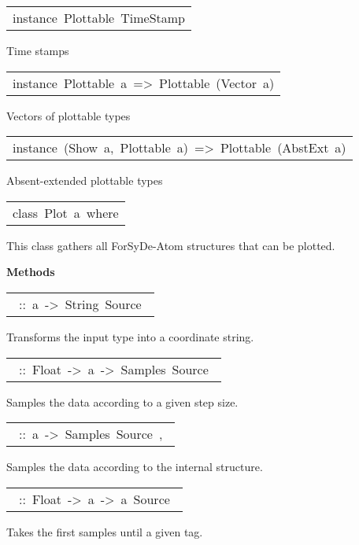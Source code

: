 \begin{haddockdesc}
\item[\begin{tabular}{@{}l}
instance\ Plottable\ TimeStamp
\end{tabular}]\haddockbegindoc
Time stamps\par


\item[\begin{tabular}{@{}l}
instance\ Plottable\ a\ =>\ Plottable\ (Vector\ a)
\end{tabular}]\haddockbegindoc
Vectors of plottable types\par


\item[\begin{tabular}{@{}l}
instance\ (Show\ a,\ Plottable\ a)\ =>\ Plottable\ (AbstExt\ a)
\end{tabular}]\haddockbegindoc
Absent-extended plottable types\par


\item[\begin{tabular}{@{}l}
class\ Plot\ a\ where
\end{tabular}]\haddockbegindoc
This class gathers all ForSyDe-Atom structures that can be
 plotted.\par

\haddockpremethods{}\textbf{Methods}
\begin{haddockdesc}
\item[\begin{tabular}{@{}l}\haddockid{toCoord}\ ::\ a\ ->\ String\ Source\ \end{tabular}]
\haddockbegindoc
Transforms the input type into a coordinate string.\par

\item[\begin{tabular}{@{}l}\haddockid{sample}\ ::\ Float\ ->\ a\ ->\ Samples\ Source\ \end{tabular}]
\haddockbegindoc
Samples the data according to a given step size.\par

\item[\begin{tabular}{@{}l}\haddockid{sample}\ ::\ a\ ->\ Samples\ Source\ ,\ \end{tabular}]
\haddockbegindoc
Samples the data according to the internal structure.\par

\item[\begin{tabular}{@{}l}\haddockid{takeUntil}\ ::\ Float\ ->\ a\ ->\ a\ Source\ \end{tabular}]
\haddockbegindoc
Takes the first samples until a given tag.\par


\end{haddockdesc}
\end{haddockdesc}
